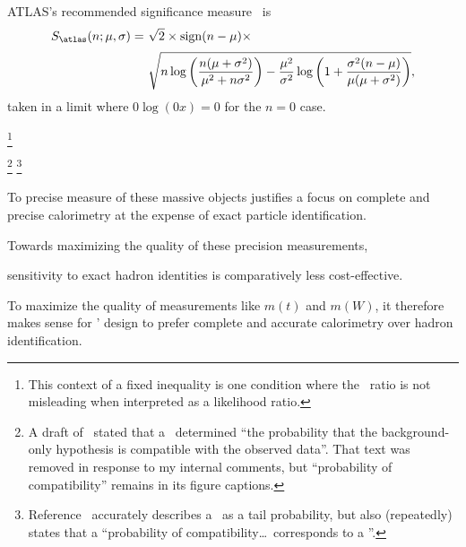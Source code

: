 ATLAS's recommended significance measure~\cite{atlas_significance} is
\begin{align}
\label{eqn:significance_atlas}
S_\mathrm{\atlas}(n; \mu, \sigma) =~&
\sqrt{2} \times
\mathrm{sign}(n - \mu) \times
\\[0.2em] \nonumber
&
\sqrt{
n\log\left(\frac{n(\mu + \sigma^2)}{\mu^2 + n\sigma^2}\right)
- \frac{\mu^2}{\sigma^2}\log\left(
1 + \frac{\sigma^2(n - \mu)}{\mu(\mu + \sigma^2)}
\right)
}
,
\end{align}
taken in a limit where $0\log(0x) = 0$ for the $n=0$ case.


%
\footnote{%
This context of a fixed inequality is one condition where the
\pvalue\ ratio is not misleading when interpreted as a likelihood ratio.%
}


%
\footnote{%
A draft of~\cite{HIGG-2018-51} stated that a \pvalue\ determined
``the probability that the background-only hypothesis is compatible with the
observed data''.
That text was removed in response to my internal comments, but
``probability of compatibility'' remains in its figure captions.%
}%
\footnote{%
Reference~\cite{HIGG-2018-57} accurately describes a \pvalue\ as a tail
probability, but also (repeatedly) states that a
``probability of compatibility\ldots\ corresponds to a \pvalue''.%
}%




To precise measure of these massive objects
justifies a focus on complete and precise calorimetry
at the expense of exact particle identification.



Towards maximizing the quality of these precision measurements,


sensitivity to
exact hadron identities is comparatively less cost-effective.%


To maximize the quality of measurements like $m(t)$ and $m(W)$, it therefore
makes sense for \atlas' design to prefer complete and accurate calorimetry over
hadron identification.

